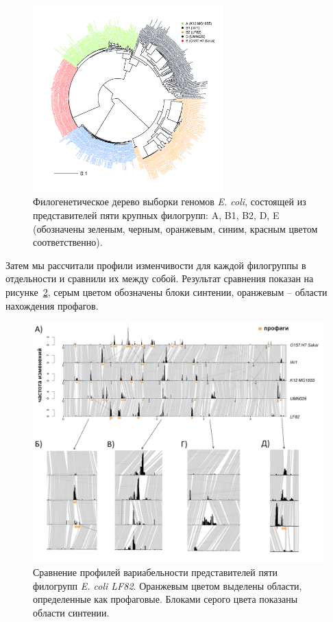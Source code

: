 \begin{figure}[!ht] 
    \center
      \includegraphics[width=0.65\textwidth]{Dissertation/images/complexity/coli_phylogroups.png}
    \caption{Филогенетическое дерево выборки геномов \textit{E. coli}, состоящей из представителей пяти крупных филогрупп: A, B1, B2, D, E (обозначены зеленым, черным, оранжевым, синим, красным цветом соответственно).}
    \label{img:phylogroups} 
  \end{figure} 

Затем мы рассчитали профили изменчивости для каждой филогруппы в отдельности и сравнили их между собой. Результат сравнения показан на рисунке~\ref{img:phylogroups_complex}, серым цветом обозначены блоки синтении, оранжевым -- области нахождения профагов.    

\begin{figure}[!ht] 
    \center
      \includegraphics[width=\textwidth]{Dissertation/images/complexity/coli_phylogroups_complexity_3.png}
    \caption{Сравнение профилей вариабельности представителей пяти филогрупп \textit{E. coli LF82}. Оранжевым цветом выделены области, определенные как профаговые. Блоками серого цвета показаны области синтении.}
    \label{img:phylogroups_complex} 
  \end{figure}
  

